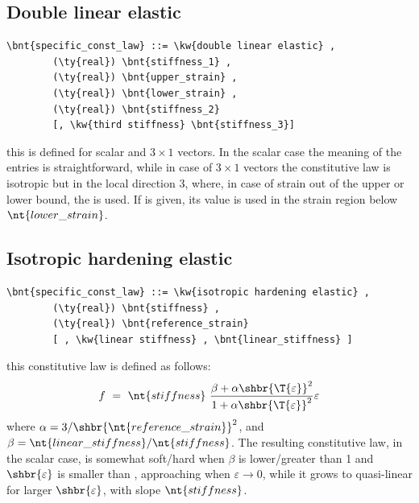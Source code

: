 \subsection{Double linear elastic}
\begin{Verbatim}[commandchars=\\\{\}]
    \bnt{specific_const_law} ::= \kw{double linear elastic} ,
        (\ty{real}) \bnt{stiffness_1} ,
        (\ty{real}) \bnt{upper_strain} ,
        (\ty{real}) \bnt{lower_strain} ,
        (\ty{real}) \bnt{stiffness_2}
        [, \kw{third stiffness} \bnt{stiffness_3}]
\end{Verbatim}
this is defined for scalar and $3 \times 1$ vectors. In the scalar case the
meaning of the entries is straightforward,
while in case of $3 \times 1$ vectors the constitutive law is isotropic
but in the local direction 3, where, in case of strain
out of the upper or lower bound, the  is used.
If  is given, its value is used in the strain region 
below $\nt{lower\_strain}$.
\subsection{Isotropic hardening elastic}
\begin{Verbatim}[commandchars=\\\{\}]
    \bnt{specific_const_law} ::= \kw{isotropic hardening elastic} ,
        (\ty{real}) \bnt{stiffness} ,
        (\ty{real}) \bnt{reference_strain}
        [ , \kw{linear stiffness} , \bnt{linear_stiffness} ]
\end{Verbatim}
this constitutive law is defined as follows:
\begin{displaymath}
    f \ = \ \nt{stiffness} \ \frac{
        \beta + \alpha\shbr{\T{\varepsilon}}^2
    }{
        1 + \alpha\shbr{\T{\varepsilon}}^2
    }\varepsilon
\end{displaymath}
where $\alpha=3/\shbr{\nt{reference\_strain}}^2$,
and $\beta=\nt{linear\_stiffness}/\nt{stiffness}$.
The resulting constitutive law, in the scalar case,
is somewhat soft/hard when $\beta$ is lower/greater than 1
and $\shbr{\varepsilon}$ is smaller than ,
approaching  when $\varepsilon\rightarrow{0}$,
while it grows to quasi-linear for larger $\shbr{\varepsilon}$, 
with slope $\nt{stiffness}$.

